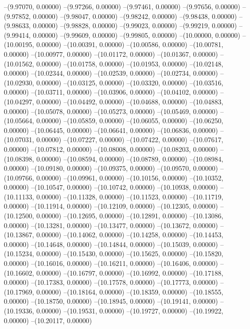 --(9.97070, 0.00000)
--(9.97266, 0.00000)
--(9.97461, 0.00000)
--(9.97656, 0.00000)
--(9.97852, 0.00000)
--(9.98047, 0.00000)
--(9.98242, 0.00000)
--(9.98438, 0.00000)
--(9.98633, 0.00000)
--(9.98828, 0.00000)
--(9.99023, 0.00000)
--(9.99219, 0.00000)
--(9.99414, 0.00000)
--(9.99609, 0.00000)
--(9.99805, 0.00000)
--(10.00000, 0.00000)
--(10.00195, 0.00000)
--(10.00391, 0.00000)
--(10.00586, 0.00000)
--(10.00781, 0.00000)
--(10.00977, 0.00000)
--(10.01172, 0.00000)
--(10.01367, 0.00000)
--(10.01562, 0.00000)
--(10.01758, 0.00000)
--(10.01953, 0.00000)
--(10.02148, 0.00000)
--(10.02344, 0.00000)
--(10.02539, 0.00000)
--(10.02734, 0.00000)
--(10.02930, 0.00000)
--(10.03125, 0.00000)
--(10.03320, 0.00000)
--(10.03516, 0.00000)
--(10.03711, 0.00000)
--(10.03906, 0.00000)
--(10.04102, 0.00000)
--(10.04297, 0.00000)
--(10.04492, 0.00000)
--(10.04688, 0.00000)
--(10.04883, 0.00000)
--(10.05078, 0.00000)
--(10.05273, 0.00000)
--(10.05469, 0.00000)
--(10.05664, 0.00000)
--(10.05859, 0.00000)
--(10.06055, 0.00000)
--(10.06250, 0.00000)
--(10.06445, 0.00000)
--(10.06641, 0.00000)
--(10.06836, 0.00000)
--(10.07031, 0.00000)
--(10.07227, 0.00000)
--(10.07422, 0.00000)
--(10.07617, 0.00000)
--(10.07812, 0.00000)
--(10.08008, 0.00000)
--(10.08203, 0.00000)
--(10.08398, 0.00000)
--(10.08594, 0.00000)
--(10.08789, 0.00000)
--(10.08984, 0.00000)
--(10.09180, 0.00000)
--(10.09375, 0.00000)
--(10.09570, 0.00000)
--(10.09766, 0.00000)
--(10.09961, 0.00000)
--(10.10156, 0.00000)
--(10.10352, 0.00000)
--(10.10547, 0.00000)
--(10.10742, 0.00000)
--(10.10938, 0.00000)
--(10.11133, 0.00000)
--(10.11328, 0.00000)
--(10.11523, 0.00000)
--(10.11719, 0.00000)
--(10.11914, 0.00000)
--(10.12109, 0.00000)
--(10.12305, 0.00000)
--(10.12500, 0.00000)
--(10.12695, 0.00000)
--(10.12891, 0.00000)
--(10.13086, 0.00000)
--(10.13281, 0.00000)
--(10.13477, 0.00000)
--(10.13672, 0.00000)
--(10.13867, 0.00000)
--(10.14062, 0.00000)
--(10.14258, 0.00000)
--(10.14453, 0.00000)
--(10.14648, 0.00000)
--(10.14844, 0.00000)
--(10.15039, 0.00000)
--(10.15234, 0.00000)
--(10.15430, 0.00000)
--(10.15625, 0.00000)
--(10.15820, 0.00000)
--(10.16016, 0.00000)
--(10.16211, 0.00000)
--(10.16406, 0.00000)
--(10.16602, 0.00000)
--(10.16797, 0.00000)
--(10.16992, 0.00000)
--(10.17188, 0.00000)
--(10.17383, 0.00000)
--(10.17578, 0.00000)
--(10.17773, 0.00000)
--(10.17969, 0.00000)
--(10.18164, 0.00000)
--(10.18359, 0.00000)
--(10.18555, 0.00000)
--(10.18750, 0.00000)
--(10.18945, 0.00000)
--(10.19141, 0.00000)
--(10.19336, 0.00000)
--(10.19531, 0.00000)
--(10.19727, 0.00000)
--(10.19922, 0.00000)
--(10.20117, 0.00000)
